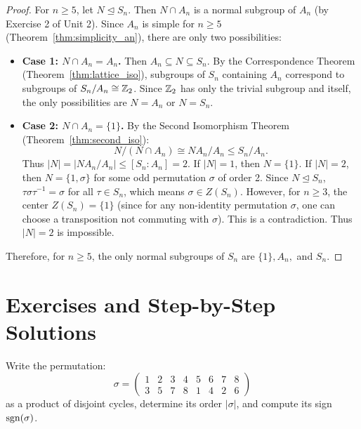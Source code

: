 \begin{proof}
For $n \ge 5$, let $N \trianglelefteq S_n$.
Then $N \cap A_n$ is a normal subgroup of $A_n$ (by Exercise 2 of Unit 2).
Since $A_n$ is simple for $n \ge 5$ (Theorem~\ref{thm:simplicity_an}), there are only two possibilities:
\begin{itemize}[leftmargin=1.5em, itemsep=4pt]
    \item \textbf{Case 1: $N \cap A_n = A_n$.}
    Then $A_n \subseteq N \subseteq S_n$.
    By the Correspondence Theorem (Theorem~\ref{thm:lattice_iso}), subgroups of $S_n$ containing $A_n$ correspond to subgroups of $S_n/A_n \cong \mathbb{Z}_2$.
    Since $\mathbb{Z}_2$ has only the trivial subgroup and itself, the only possibilities are $N = A_n$ or $N = S_n$.

    \item \textbf{Case 2: $N \cap A_n = \{1\}$.}
    By the Second Isomorphism Theorem (Theorem~\ref{thm:second_iso}):
    \begin{equation*}
    N / (N \cap A_n) \cong NA_n / A_n \le S_n / A_n.
    \end{equation*}
    Thus $|N| = |NA_n / A_n| \le [S_n : A_n] = 2$.
    If $|N| = 1$, then $N = \{1\}$.
    If $|N| = 2$, then $N = \{1, \sigma\}$ for some odd permutation $\sigma$ of order 2.
    Since $N \trianglelefteq S_n$, $\tau \sigma \tau^{-1} = \sigma$ for all $\tau \in S_n$, which means $\sigma \in Z(S_n)$.
    However, for $n \ge 3$, the center $Z(S_n) = \{1\}$ (since for any non-identity permutation $\sigma$, one can choose a transposition not commuting with $\sigma$).
    This is a contradiction. Thus $|N| = 2$ is impossible.
\end{itemize}
Therefore, for $n \ge 5$, the only normal subgroups of $S_n$ are $\{1\}, A_n,$ and $S_n$.
\end{proof}

\section{Exercises and Step-by-Step Solutions}
\label{sec:unit3_exercises}

\begin{problem}
Write the permutation:
\begin{equation}
\sigma = \begin{pmatrix} 1 & 2 & 3 & 4 & 5 & 6 & 7 & 8 \\ 3 & 5 & 7 & 8 & 1 & 4 & 2 & 6 \end{pmatrix}
\end{equation}
as a product of disjoint cycles, determine its order $|\sigma|$, and compute its sign $\operatorname{sgn}(\sigma)$.
\end{problem}

